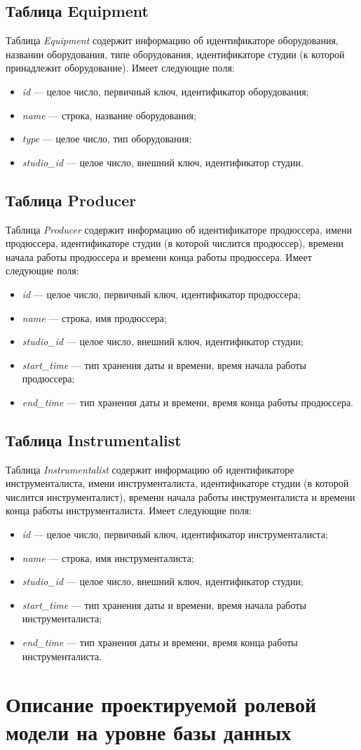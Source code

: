 \subsection{Таблица Equipment}
Таблица \textit{Equipment} содержит информацию об идентификаторе оборудования, названии оборудования, типе оборудования, идентификаторе студии (к которой принадлежит оборудование).
Имеет следующие поля:
\begin{itemize}
	\item \textit{id} --- целое число, первичный ключ, идентификатор оборудования;
	\item \textit{name} --- строка, название оборудования;
	\item \textit{type} --- целое число, тип оборудования;
	\item \textit{studio\_id} --- целое число, внешний ключ, идентификатор студии.
\end{itemize}
\subsection{Таблица Producer}
Таблица \textit{Producer} содержит информацию об идентификаторе продюссера, имени продюссера, идентификаторе студии (в которой числится продюссер), времени начала работы продюссера и времени конца работы продюссера.
Имеет следующие поля:
\begin{itemize}
	\item \textit{id} --- целое число, первичный ключ, идентификатор продюссера;
	\item \textit{name} --- строка, имя продюссера;
	\item \textit{studio\_id} --- целое число, внешний ключ, идентификатор студии;
	\item \textit{start\_time} --- тип хранения даты и времени, время начала работы продюссера;
	\item \textit{end\_time} --- тип хранения даты и времени, время конца работы продюссера.
\end{itemize}
\subsection{Таблица Instrumentalist}
Таблица \textit{Instrumentalist} содержит информацию об идентификаторе инструменталиста, имени инструменталиста, идентификаторе студии (в которой числится инструменталист), времени начала работы инструменталиста и времени конца работы инструменталиста.
Имеет следующие поля:
\begin{itemize}
	\item \textit{id} --- целое число, первичный ключ, идентификатор инструменталиста;
	\item \textit{name} --- строка, имя инструменталиста;
	\item \textit{studio\_id} --- целое число, внешний ключ, идентификатор студии;
	\item \textit{start\_time} --- тип хранения даты и времени, время начала работы инструменталиста;
	\item \textit{end\_time} --- тип хранения даты и времени, время конца работы инструменталиста.
\end{itemize}

\section{Описание проектируемой ролевой модели на уровне базы данных}